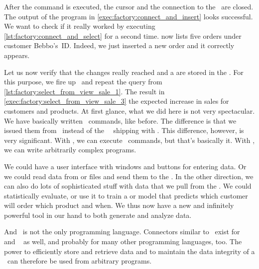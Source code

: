 After the command is executed, the cursor and the connection to the \db\ are closed.
The output of the program in \cref{exec:factory:connect_and_insert} looks successful.
We want to check if it really worked by executing \cref{lst:factory:connect_and_select} for a second time.
 now lists five orders under customer Bebbo's~ID.
Indeed, we just inserted a new order and it correctly appears.

%
%
%
Let us now verify that the changes really reached and a are stored in the \db.
For this purpose, we fire up \psql\ and repeat the query from \cref{lst:factory:select_from_view_sale_1}.
The result in \cref{exec:factory:select_from_view_sale_3} the expected increase in sales for customers and products.%
%
\endhsection%
%
%
At first glance, what we did here is not very spectacular.
We have basically written \sql\ commands, like before.
The difference is that we issued them from \python\ instead of the \psql\ \client\ shipping with \postgresql.
This difference, however, is very significant.
With \psql, we can execute \sql\ commands, but that's basically it.
With \python, we can write arbitrarily complex programs.

We could have a user interface with windows and buttons for entering data.
Or we could read data from  or  files and send them to the \dbms.
In the other direction, we can also do lots of sophisticated stuff with data that we pull from the \db.
We could statistically evaluate, or use it to train a  or  model that predicts which customer will order which product and when.
We thus now have a new and infinitely powerful tool in our hand to both generate and analyze data.

And \python\ is not the only programming language.
Connectors similar to \psycopg\ exist for ~\cite{PGDG:PJD} and ~\cite{PGDG:PD:LCL} as well, and probably for many other programming languages, too.
The power to efficiently store and retrieve data and to maintain the data integrity of a \dbms\ can therefore be used from arbitrary programs.%
%
%
%
\FloatBarrier%
\endhsection%
\endhsection%
%
